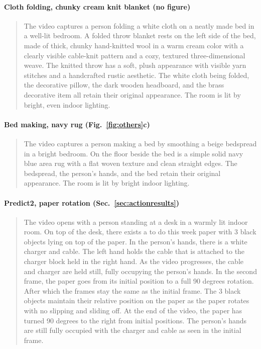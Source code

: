 \paragraph{Cloth folding, chunky cream knit blanket (no figure)}
\begin{quote}\small
The video captures a person folding a white cloth on a neatly made bed in a well-lit bedroom. A folded throw blanket rests on the left side of the bed, made of thick, chunky hand-knitted wool in a warm cream color with a clearly visible cable-knit pattern and a cozy, textured three-dimensional weave. The knitted throw has a soft, plush appearance with visible yarn stitches and a handcrafted rustic aesthetic. The white cloth being folded, the decorative pillow, the dark wooden headboard, and the brass decorative item all retain their original appearance. The room is lit by bright, even indoor lighting.
\end{quote}

\paragraph{Bed making, navy rug (Fig.~\ref{fig:others}c)}
\begin{quote}\small
The video captures a person making a bed by smoothing a beige bedspread in a bright bedroom. On the floor beside the bed is a simple solid navy blue area rug with a flat woven texture and clean straight edges. The bedspread, the person's hands, and the bed retain their original appearance. The room is lit by bright indoor lighting.
\end{quote}

\paragraph{Predict2, paper rotation (Sec.~\ref{sec:actionresults})}
\begin{quote}\small
The video opens with a person standing at a desk in a warmly lit indoor room. On top of the desk, there exists a to do this week paper with 3 black objects lying on top of the paper. In the person's hands, there is a white charger and cable. The left hand holds the cable that is attached to the charger block held in the right hand. As the video progresses, the cable and charger are held still, fully occupying the person's hands. In the second frame, the paper goes from its initial position to a full 90 degrees rotation. After which the frames stay the same as the initial frame. The 3 black objects maintain their relative position on the paper as the paper rotates with no slipping and sliding off. At the end of the video, the paper has turned 90 degrees to the right from initial positions. The person's hands are still fully occupied with the charger and cable as seen in the initial frame.
\end{quote}

